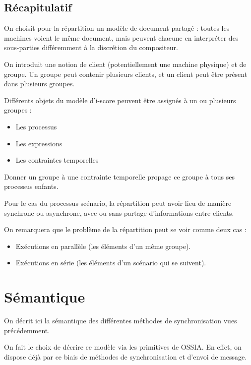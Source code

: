 \documentclass{article}
\newcommand\ossia{OSSIA\xspace}
\begin{document}
\subsection{Récapitulatif}
On choisit pour la répartition un modèle de document partagé : toutes les machines voient le même document, mais peuvent chacune en interpréter des sous-parties différemment à la discrétion du compositeur.

On introduit une notion de client (potentiellement une machine physique) et de groupe.
Un groupe peut contenir plusieurs clients, et un client peut être présent dans plusieurs groupes.

Différents objets du modèle d'i-score peuvent être assignés à un ou plusieurs groupes : 

\begin{itemize}
	\item Les processus
	\item Les expressions
	\item Les contraintes temporelles
\end{itemize}

Donner un groupe à une contrainte temporelle propage ce groupe à tous ses processus enfants.

Pour le cas du processus scénario, la répartition peut avoir lieu de manière synchrone ou asynchrone, 
avec ou sans partage d'informations entre clients.

On remarquera que le problème de la répartition peut se voir comme deux cas : 
\begin{itemize}
	\item Exécutions en parallèle (les éléments d'un même groupe).
	\item Exécutions en série (les éléments d'un scénario qui se suivent).
\end{itemize}

\section{Sémantique}\label{sec.semantique}
On décrit ici la sémantique des différentes méthodes de synchronisation vues précédemment.

On fait le choix de décrire ce modèle via les primitives de \ossia{}. 
En effet, on dispose déjà par ce biais de méthodes de synchronisation et d'envoi de message.

\end{document}
